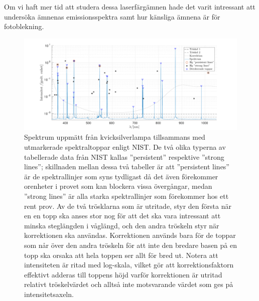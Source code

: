 \documentclass[11pt,a4paper]{article}
\begin{document}
Om vi haft mer tid att studera dessa laserfärgämnen hade det varit intressant att undersöka ämnenas emissionsspektra samt hur känsliga ämnena är för fotoblekning. 

\begin{figure}
\centering
\centerline{ %
\includegraphics[width=1.2\textwidth]{Hg_spektrum.pdf}
}
\caption{Spektrum uppmätt från kvicksilverlampa tillsammans med
  utmarkerade spektraltoppar enligt NIST\cite{NIST_spectrum}. De två olika typerna av tabellerade data från NIST kallas ''persistent''
  respektive ''strong lines''; skillnaden mellan dessa två tabeller är
  att ''persistent lines'' är de spektrallinjer som syns tydligast
  då det även förekommer orenheter i provet som kan blockera vissa
  övergångar, medan ''strong lines'' är alla starka spektrallinjer som
  förekommer hos ett rent prov.
  Av de två trösklarna som är utritade, styr den första när en en topp
  ska anses stor nog för att det ska vara intressant att minska
  steglängden i våglängd, och den andra tröskeln styr när korrektionen
  ska användas. Korrektionen används bara för de toppar som når över
  den andra tröskeln för att inte den bredare basen på en topp ska
  orsaka att hela toppen ser allt för bred ut. Notera att intensiteten
  är ritad med log-skala, vilket gör att korrektionsfaktorn effektivt
  adderas till toppens höjd varför korrektionen är utritad relativt
  tröskelvärdet och alltså inte motsvarande värdet som ges på
  intensitetsaxeln. 
}
\label{fig:Hg_spektrum} 
\end{figure}
\end{document}
